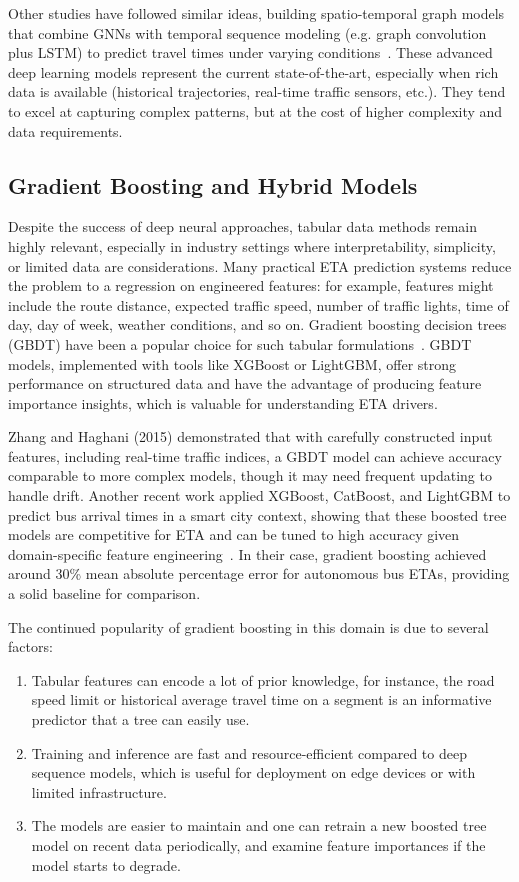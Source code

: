 Other studies have followed similar ideas, building spatio-temporal graph models that combine GNNs with temporal sequence modeling (e.g. graph convolution plus LSTM) to predict travel times under varying conditions~\cite{jia2021stgnn, guo2022graphtraffic}.
These advanced deep learning models represent the current state-of-the-art, especially when rich data is available (historical trajectories, real-time traffic sensors, etc.).
They tend to excel at capturing complex patterns, but at the cost of higher complexity and data requirements.

\subsection{Gradient Boosting and Hybrid Models}
Despite the success of deep neural approaches, tabular data methods remain highly relevant, especially in industry settings where interpretability, simplicity, or limited data are considerations.
Many practical ETA prediction systems reduce the problem to a regression on engineered features: for example, features might include the route distance, expected traffic speed, number of traffic lights, time of day, day of week, weather conditions, and so on.
Gradient boosting decision trees (GBDT) have been a popular choice for such tabular formulations~\cite{guin2006gbdt, zhang2015traveltimegbt}.
GBDT models, implemented with tools like XGBoost or LightGBM, offer strong performance on structured data and have the advantage of producing feature importance insights, which is valuable for understanding ETA drivers.

Zhang and Haghani (2015) demonstrated that with carefully constructed input features, including real-time traffic indices, a GBDT model can achieve accuracy comparable to more complex models, though it may need frequent updating to handle drift.
Another recent work applied XGBoost, CatBoost, and LightGBM to predict bus arrival times in a smart city context, showing that these boosted tree models are competitive for ETA and can be tuned to high accuracy given domain-specific feature engineering~\cite{antypas2022etagb}.
In their case, gradient boosting achieved around 30\% mean absolute percentage error for autonomous bus ETAs, providing a solid baseline for comparison.

The continued popularity of gradient boosting in this domain is due to several factors:
\begin{enumerate}
    \item Tabular features can encode a lot of prior knowledge, for instance, the road speed limit or historical average travel time on a segment is an informative predictor that a tree can easily use.
    \item Training and inference are fast and resource-efficient compared to deep sequence models, which is useful for deployment on edge devices or with limited infrastructure.
    \item The models are easier to maintain and one can retrain a new boosted tree model on recent data periodically, and examine feature importances if the model starts to degrade.
\end{enumerate}


